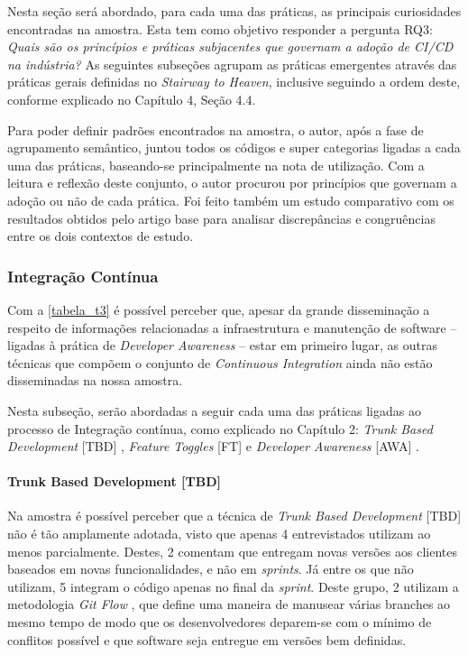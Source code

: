 Nesta seção será abordado, para cada uma das práticas, as principais curiosidades encontradas na amostra. Esta tem como objetivo responder a pergunta RQ3: \emph{Quais são os princípios e práticas subjacentes que governam a adoção de CI/CD na indústria?} As seguintes subseções agrupam as práticas emergentes através das práticas gerais definidas no \emph{Stairway to Heaven}, inclusive seguindo a ordem deste, conforme explicado no Capítulo 4, Seção 4.4.

Para poder definir padrões encontrados na amostra, o autor, após a fase de agrupamento semântico, juntou todos os códigos e super categorias ligadas a cada uma das práticas, baseando-se principalmente na nota de utilização. Com a leitura e reflexão deste conjunto, o autor procurou por princípios que governam a adoção ou não de cada prática. Foi feito também um estudo comparativo com os resultados obtidos pelo artigo base para analisar discrepâncias e congruências entre os dois contextos de estudo.

\subsubsection{Integração Contínua}

Com a \ref{tabela_t3} é possível perceber que, apesar da grande disseminação a respeito de informações relacionadas a infraestrutura e manutenção de software -- ligadas à prática de \emph{Developer Awareness} \cite{awa} -- estar em primeiro lugar, as outras técnicas que compõem o conjunto de \emph{Continuous Integration} ainda não estão disseminadas na nossa amostra.

Nesta subseção, serão abordadas a seguir cada uma das práticas ligadas ao processo de Integração contínua, como explicado no Capítulo 2: \emph{Trunk Based Development} [TBD] \cite{devAndDeploymentFB}, \emph{Feature Toggles} [FT] \cite{featureToggles} e \emph{Developer Awareness} [AWA] .


\paragraph{Trunk Based Development [TBD]}
Na amostra é possível perceber que a técnica de \emph{Trunk Based Development} [TBD] não é tão amplamente adotada, visto que apenas 4 entrevistados utilizam ao menos parcialmente. Destes, 2 comentam que entregam novas versões aos clientes baseados em novas funcionalidades, e não em \emph{sprints}. Já entre os que não utilizam, 5 integram o código apenas no final da \emph{sprint}. Deste grupo, 2 utilizam a metodologia \emph{Git Flow} \cite{gitFlow}, que define uma maneira de manusear várias branches ao mesmo tempo de modo que os desenvolvedores deparem-se com o mínimo de conflitos possível e que software seja entregue em versões bem definidas.


